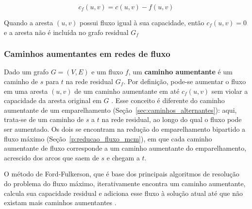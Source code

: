 \begin{equation}
    c_f(u,v) = c(u,v) - f(u,v)
\end{equation}

Quando a aresta $(u,v)$ possui fluxo igual à sua capacidade, então $c_f(u,v) = 0$ e a aresta não é incluída no grafo residual $G_f$

\subsubsection{Caminhos aumentantes em redes de fluxo}
\label{p:ford_fulkerson}

Dado um grafo $G=(V,E)$ e um fluxo $f$, um \textbf{caminho aumentante} é um caminho de $s$ para $t$ na rede residual $G_f$. Por definição, pode-se aumentar o fluxo em uma aresta $(u,v)$ de um caminho aumentante em até $c_f(u,v)$ sem violar a capacidade da aresta original em $G$ \cite{cormen}. Esse conceito é diferente do caminho aumentante de um emparelhamento (Seção~\ref{sec:caminhos_alternantes}): aqui, trata-se de um caminho de $s$ a $t$ na rede residual, ao longo do qual o fluxo pode ser aumentado. Os dois se encontram na redução do emparelhamento bipartido a fluxo máximo (Seção~\ref{p:reducao_fluxo_mcm}), em que cada caminho aumentante de fluxo corresponde a um caminho aumentante do emparelhamento, acrescido dos arcos que saem de $s$ e chegam a $t$.

O método de Ford-Fulkerson, que é base dos principais algoritmos de resolução do problema do fluxo máximo, iterativamente encontra um caminho aumentante, calcula sua capacidade residual e adiciona esse fluxo à solução atual até que não existam mais caminhos aumentantes \cite{ahuja}.

\begin{algorithm}[H]
    \DontPrintSemicolon
    \SetAlgoLined

    
    \caption{Algoritmo de Ford-Fulkerson \cite{cormen}}
    \label{alg:ford_fulkerson}
\end{algorithm}

